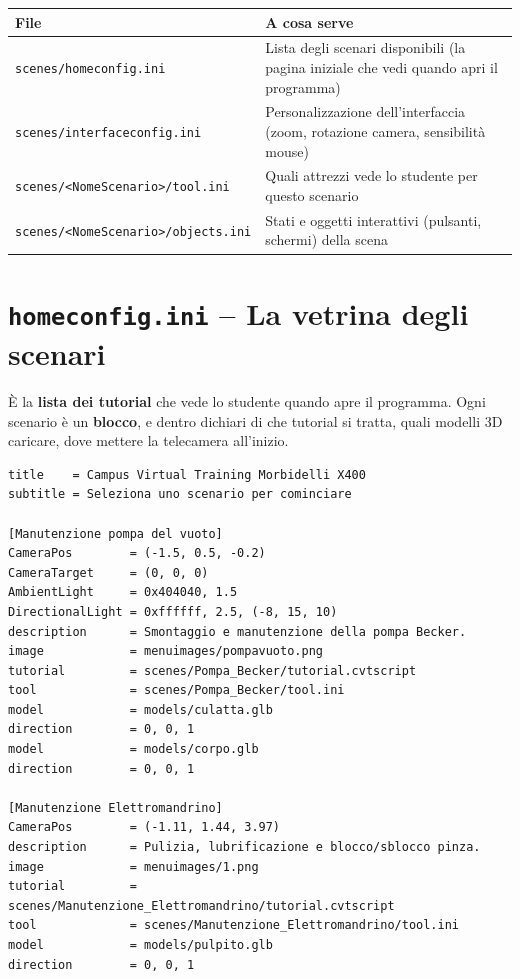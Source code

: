 ﻿\documentclass[a4paper,12pt,oneside]{book}
\newcommand{\file}[1]{\texttt{#1}}
\begin{document}
\begin{longtable}{@{}p{4.2cm}p{8.5cm}@{}}
\toprule
\textbf{File} & \textbf{A cosa serve} \\
\midrule
\file{scenes/homeconfig.ini} & Lista degli scenari disponibili (la pagina iniziale che vedi quando apri il programma) \\
\file{scenes/interfaceconfig.ini} & Personalizzazione dell'interfaccia (zoom, rotazione camera, sensibilità mouse) \\
\file{scenes/<NomeScenario>/tool.ini} & Quali attrezzi vede lo studente per questo scenario \\
\file{scenes/<NomeScenario>/objects.ini} & Stati e oggetti interattivi (pulsanti, schermi) della scena \\
\bottomrule
\end{longtable}

\section{\texttt{homeconfig.ini} -- La vetrina degli scenari}

È la \textbf{lista dei tutorial} che vede lo studente quando apre il programma.
Ogni scenario è un \textbf{blocco}, e dentro dichiari di che tutorial si tratta,
quali modelli 3D caricare, dove mettere la telecamera all'inizio.

\begin{esempiocvt}
\begin{lstlisting}
title    = Campus Virtual Training Morbidelli X400
subtitle = Seleziona uno scenario per cominciare

[Manutenzione pompa del vuoto]
CameraPos        = (-1.5, 0.5, -0.2)
CameraTarget     = (0, 0, 0)
AmbientLight     = 0x404040, 1.5
DirectionalLight = 0xffffff, 2.5, (-8, 15, 10)
description      = Smontaggio e manutenzione della pompa Becker.
image            = menuimages/pompavuoto.png
tutorial         = scenes/Pompa_Becker/tutorial.cvtscript
tool             = scenes/Pompa_Becker/tool.ini
model            = models/culatta.glb
direction        = 0, 0, 1
model            = models/corpo.glb
direction        = 0, 0, 1

[Manutenzione Elettromandrino]
CameraPos        = (-1.11, 1.44, 3.97)
description      = Pulizia, lubrificazione e blocco/sblocco pinza.
image            = menuimages/1.png
tutorial         = scenes/Manutenzione_Elettromandrino/tutorial.cvtscript
tool             = scenes/Manutenzione_Elettromandrino/tool.ini
model            = models/pulpito.glb
direction        = 0, 0, 1
\end{lstlisting}
\end{esempiocvt}
\end{document}

